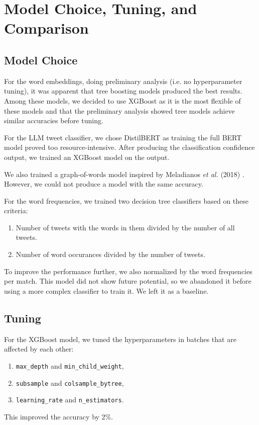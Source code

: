 \documentclass[twocolumn]{article}
\begin{document}
\section{Model Choice, Tuning, and Comparison}
\subsection{Model Choice}
For the word embeddings, doing preliminary analysis (i.e. no hyperparameter tuning), it was apparent
that tree boosting models produced the best results. Among these models, we decided to use XGBoost
\cite{chen2016xgboost} as it is the most flexible of these models and that the preliminary analysis
showed tree models achieve similar accuracies before tuning.

For the LLM tweet classifier, we chose DistilBERT \cite{sanh2020distilbert} as training the full
BERT model proved too resource-intensive. After producing the classification confidence output, we
trained an XGBoost model on the output.

We also trained a graph-of-words model inspired by Meladianos \textit{et al.} (2018)
\cite{meladianos2018subevent}. However, we could not produce a model with the same accuracy.

For the word frequencies, we trained two decision tree classifiers based on these criteria:
\begin{enumerate}
    \item Number of tweets with the words in them divided by the number of all tweets.
    \item Number of word occurances divided by the number of tweets.
\end{enumerate}
To improve the performance further, we also normalized by the word frequencies per match.
This model did not show future potential, so we abandoned it before using a more complex classifier
to train it. We left it as a baseline.

\subsection{Tuning}
For the XGBoost model, we tuned the hyperparameters in batches that are affected by each other:
\begin{enumerate}
    \item \texttt{max\_depth} and \texttt{min\_child\_weight},
    \item \texttt{subsample} and \texttt{colsample\_bytree},
    \item \texttt{learning\_rate} and \texttt{n\_estimators}.
\end{enumerate}
This improved the accuracy by 2\%.
\end{document}
